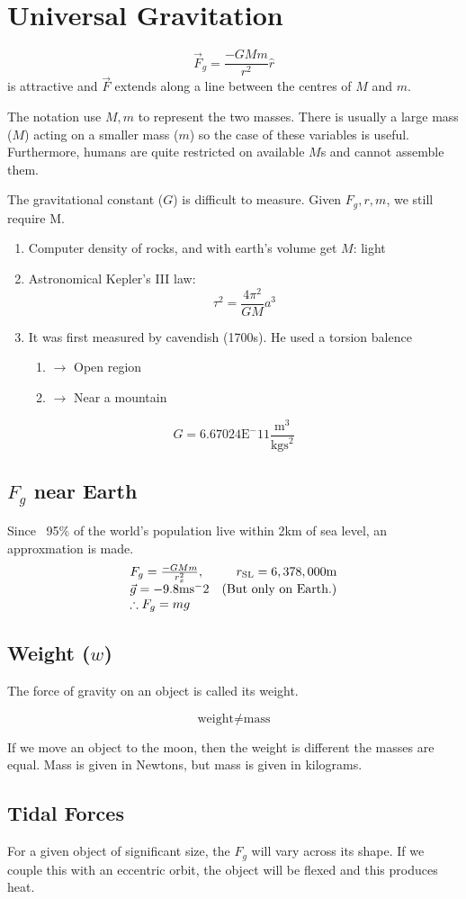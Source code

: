 \documentclass[letterpaper, 12pt]{article}
\begin{document}
\section{Universal Gravitation}
\begin{equation}
    \vec{F}_g = \frac{-GMm}{r^2} \hat{r}
\end{equation}
is attractive and $\vec{F}$ extends along a line between the centres of $M$ and
$m$.

The notation use $M, m$ to represent the two masses. There is usually a large
mass ($M$) acting on a smaller mass ($m$) so the case of these variables is useful.
Furthermore, humans are quite restricted on available $M$s and cannot assemble them.

The gravitational constant ($G$) is difficult to measure. Given $F_g, r, m$, we still
require M.
\begin{enumerate}
    \item Computer density of rocks, and with earth's volume get $M$: light
    \item Astronomical Kepler's III law:
    \[
        \tau^2 = \frac{4\pi^2}{GM} a^3
    \]
    \item It was first measured by cavendish (1700s). He used a torsion balence
    \begin{enumerate}
        \item $\to$ Open region
        \item $\to$ Near a mountain
    \end{enumerate}
\end{enumerate}
\[
    G = 6.67024 \textrm{E}^-11 \frac{\textrm{m}^3}{\textrm{kgs}^2}
\]
\subsection{$F_g$ near Earth}
Since ~95\% of the world's population live within 2km of sea level, an approxmation
is made.
\[
    \begin{array}{l r}
    F_g = \frac{-GMm}{r^2_x}, & r_{\textrm{SL}} = 6,378,000 \textrm{m}\\
    \vec{g} = -9.8\textrm{ms}^-2 & \textrm{(But only on Earth.)}\\
    \therefore F_g = mg
    \end{array}
\]
\subsection{Weight ($w$)}
The force of gravity on an object is called its weight.

\[
    \textrm{weight} \neq \textrm{mass}
\]

If we move an object to the moon, then the weight is different the masses
are equal. Mass is given in Newtons, but mass is given in kilograms.
\subsection{Tidal Forces}
For a given object of significant size, the $F_g$ will vary across its shape.
If we couple this with an eccentric orbit, the object will be flexed and this
produces heat.
\end{document}
